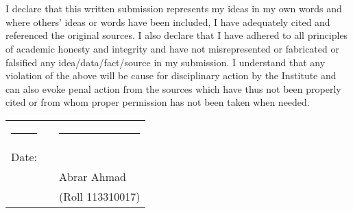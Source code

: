 \documentclass[12pt, a4paper, openright]{book}
\begin{document}
\chapter*{}
\thispagestyle{empty}

I declare that this written submission represents my ideas in my own words
and where others' ideas or words have been included, I have adequately cited
and referenced the original sources. I also declare that I have adhered to all
principles of academic honesty and integrity and have not misrepresented or
fabricated or falsified any idea/data/fact/source in my submission. I
understand that any violation of the above will be cause for disciplinary
action by the Institute and can also evoke penal action from the sources which
have thus not been properly cited or from whom proper permission has not been
taken when needed.

\vspace{1.5cm}

\begin{tabular}{lll}
\rule{40mm}{0pt}        & \rule{50mm}{0pt}       & \rule{55mm}{0pt} \\
Date:\dotfill           &                        & \dotfill \\
                        &                        & Abrar Ahmad \\
                        &                        & (Roll 113310017)\\
\end{tabular}
\end{document}
